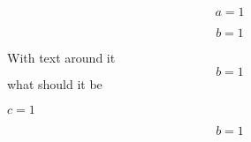 \begin{equation}
    a=1
\label{eq:1}
\end{equation}

$$b=1$$

With text around it $$b=1$$ what should it be

$c=1$

\[
    b = 1
\]